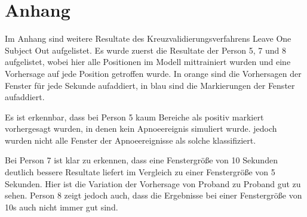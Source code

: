 \chapter{Anhang}
\label{ch:anhang}
Im Anhang sind weitere Resultate des Kreuzvalidierungsverfahrens {\glqq Leave One Subject Out\grqq} aufgelistet.
Es wurde zuerst die Resultate der Person 5, 7 und 8 aufgelistet, wobei hier alle Positionen im Modell mittrainiert wurden und eine Vorhersage auf jede Position getroffen wurde.
In orange sind die Vorhersagen der Fenster für jede Sekunde aufaddiert, in blau sind die Markierungen der Fenster aufaddiert.

Es ist erkennbar, dass bei Person 5 kaum Bereiche als positiv markiert vorhergesagt wurden, in denen kein Apnoeereignis simuliert wurde.
jedoch wurden nicht alle Fenster der Apnoeereignisse als solche klassifiziert.

Bei Person 7 ist klar zu erkennen, dass eine Fenstergröße von 10 Sekunden deutlich bessere Resultate liefert im Vergleich zu einer Fenstergröße von 5 Sekunden.
Hier ist die Variation der Vorhersage von Proband zu Proband gut zu sehen.
Person 8 zeigt jedoch auch, dass die Ergebnisse bei einer Fenstergröße von 10s auch nicht immer gut sind.

%

